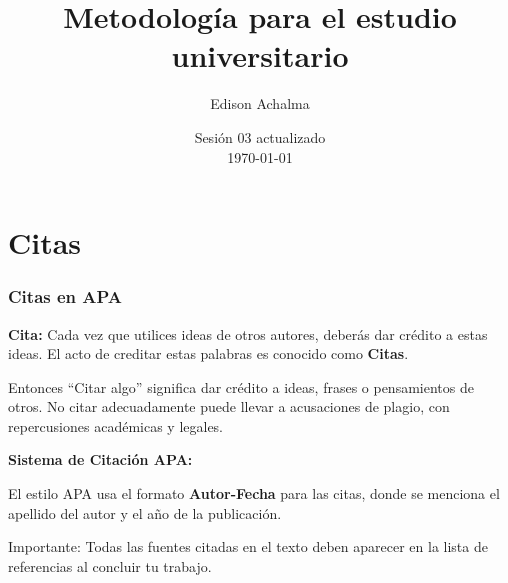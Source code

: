\documentclass[
11pt, %
]{beamer}
\title[Metodología de Investigación]{Metodología para el estudio universitario} %
\author[Edison Achalma]{Edison Achalma} %
\institute[CAU - UNSCH]{Corporación Académica Universitaria CAU - UNSCH \\ \smallskip \textit{achalmed.18@gmail.com}} %
\date[\today]{Sesión 03 actualizado \\ \today} %
\begin{document}
\begin{frame}
	\titlepage
\end{frame}





\section{Citas}
\begin{frame}
	\frametitle{Citas en APA}
	\begin{block}{}
		\textbf{Cita:} Cada vez que utilices ideas de otros autores, deberás dar crédito a estas ideas. El acto de creditar estas palabras es conocido como \textbf{Citas}.
	\end{block}

	Entonces “Citar algo” significa dar crédito a ideas, frases o pensamientos de otros. No citar adecuadamente puede llevar a acusaciones de plagio, con repercusiones académicas y legales.

	\textbf{Sistema de Citación APA:}

	El estilo APA usa el formato \textbf{Autor-Fecha} para las citas, donde se menciona el apellido del autor y el año de la publicación.

	\begin{alertblock}{Importante:}
		Todas las fuentes citadas en el texto deben aparecer en la lista de referencias al concluir tu trabajo.
	\end{alertblock}
\end{frame}
\end{document}
